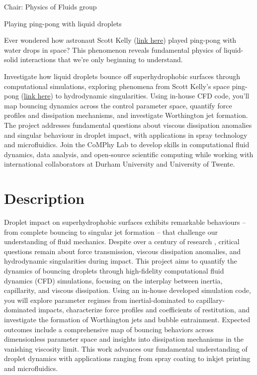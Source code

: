 \documentclass[a4paper,10pt]{article}
\begin{document}
\noindent Chair: Physics of Fluids group
\begin{center}
 \begin{LARGE}
  Playing ping-pong with liquid droplets
 \end{LARGE}
\end{center}

\noindent Ever wondered how astronaut Scott Kelly (\href{https://www.youtube.com/watch?v=TLbhrMCM4_0}{link here}) played ping-pong with water drops in space? This phenomenon reveals fundamental physics of liquid-solid interactions that we're only beginning to understand.


\begin{tcolorbox}[colback=mgray,colframe=mpurple,title=TL;DR]
	Investigate how liquid droplets bounce off superhydrophobic surfaces through computational simulations, exploring phenomena from Scott Kelly's space ping-pong (\href{https://www.youtube.com/watch?v=TLbhrMCM4_0}{link here}) to hydrodynamic singularities. Using in-house CFD code, you'll map bouncing dynamics across the control parameter space, quantify force profiles and dissipation mechanisms, and investigate Worthington jet formation. The project addresses fundamental questions about viscous dissipation anomalies and singular behaviour in droplet impact, with applications in spray technology and microfluidics. Join the CoMPhy Lab to develop skills in computational fluid dynamics, data analysis, and open-source scientific computing while working with international collaborators at Durham University and University of Twente.
\end{tcolorbox}

\section*{Description}


Droplet impact on superhydrophobic surfaces exhibits remarkable behaviours -- from complete bouncing to singular jet formation -- that challenge our understanding of fluid mechanics. Despite over a century of research \citep{worthington1877xxviii,sanjayUnifyingTheoryScaling2025}, critical questions remain about force transmission, viscous dissipation anomalies, and hydrodynamic singularities during impact. 
This project aims to quantify the dynamics of bouncing droplets through high-fidelity computational fluid dynamics (CFD) simulations, focusing on the interplay between inertia, capillarity, and viscous dissipation. Using an in-house developed simulation code, you will explore parameter regimes from inertial-dominated to capillary-dominated impacts, characterize force profiles and coefficients of restitution, and investigate the formation of Worthington jets and bubble entrainment. Expected outcomes include a comprehensive map of bouncing behaviors across dimensionless parameter space and insights into dissipation mechanisms in the vanishing viscosity limit. This work advances our fundamental understanding of droplet dynamics with applications ranging from spray coating to inkjet printing and microfluidics.
\end{document}
